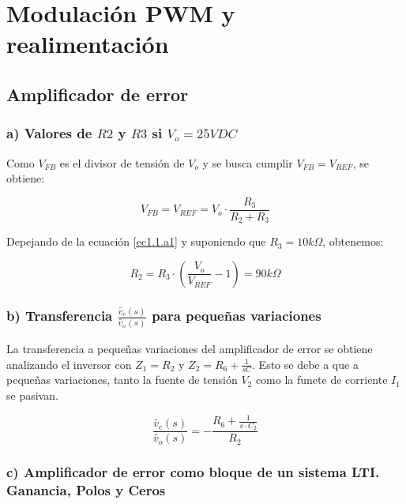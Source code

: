 \documentclass[e4_tp2_main.tex]{subfiles}
\begin{document}

\section{Modulación PWM y realimentación}

\subsection{Amplificador de error}

\subsubsection*{a) Valores de $R2$ y $R3$ si $V_o=25 VDC$}

Como $V_{FB}$ es el divisor de tensi\'on de $V_o$ y se busca cumplir $V_{FB}=V_{REF}$, se obtiene:

\begin{equation}
V_{FB}=V_{REF}= V_o \cdot \frac{R_3}{R_2+R_3} 
\label{ec1.1.a1}
\end{equation}


Depejando de la ecuaci\'on \eqref{ec1.1.a1} y suponiendo que $R_3=10k \Omega $, obtenemos:

\begin{equation}
R_2=R_3 \cdot \left( \frac{V_o}{V_{REF}} - 1 \right)=90k \Omega \label{ec1.1.a2}
\end{equation}

\subsubsection*{b) Transferencia  $\frac{ \widetilde{v_c}(s)}{\widetilde{v_o}(s)}$ para pequeñas variaciones} 

La transferencia a pequeñas variaciones del amplificador de error se obtiene analizando el inversor con $Z_1=R_2$ y $Z_2=R_6 + \frac{1}{sC}$. Esto se debe a que a pequeñas variaciones, tanto la fuente de tensi\'on $V_2$ como la funete de corriente $I_1$ se pasivan.

\begin{equation}
\frac{\widetilde{v_c}(s)}{\widetilde{v_o}(s)}=-\frac{R_6 + \frac{1}{s \cdot C_2} }{R_2}  \label{ec1.1.b}
\end{equation}

\subsubsection*{c) Amplificador de error como bloque de un sistema LTI. Ganancia, Polos y Ceros}
\end{document}
